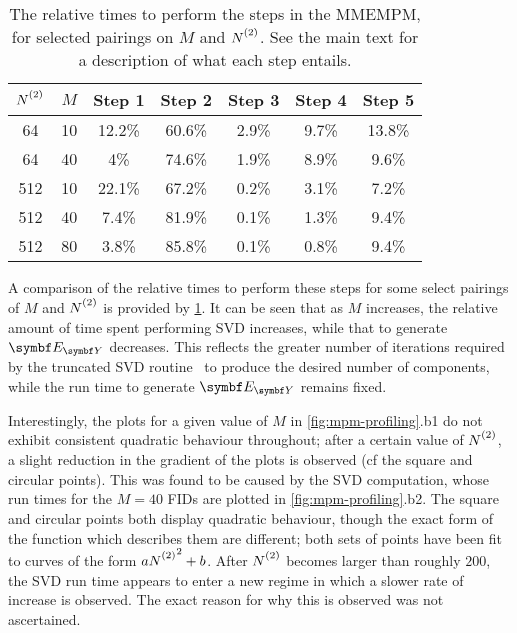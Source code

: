 \begin{table}
    \begin{center}
        \begin{tabular}{ c c c c c c c }
            \toprule
            $\Ntwo$ &
            $M$ &
            Step 1 &
            Step 2 &
            Step 3 &
            Step 4 &
            Step 5 \\
            \midrule
            64 & 10 & 12.2\% & 60.6\% & 2.9\% & 9.7\% & 13.8\% \\
            64 & 40 & 4\% & 74.6\% & 1.9\% & 8.9\% & 9.6\% \\
            512 & 10 & 22.1\% & 67.2\% & 0.2\% & 3.1\% & 7.2\% \\
            512 & 40 & 7.4\% & 81.9\% & 0.1\% & 1.3\% & 9.4\% \\
            512 & 80 & 3.8\% & 85.8\% & 0.1\% & 0.8\% & 9.4\% \\
            \bottomrule
        \end{tabular}
    \end{center}
    \caption[
        The relative times to perform the steps in the \acs{MMEMPM}.
    ]{
        The relative times to perform the steps in the
        \acs{MMEMPM}, for selected pairings on $M$ and $\Ntwo$. See the main
        text for a description of what each step entails.
    }
    \label{tab:mmempm-steps}
\end{table}
A comparison of the relative times to perform these steps for some select
pairings of $M$ and $\Ntwo$ is provided by \cref{tab:mmempm-steps}. It can be
seen that as $M$ increases, the relative amount of time spent performing
\ac{SVD} increases, while that to generate $\EY$ decreases. This
reflects the greater number of iterations required by
the truncated \ac{SVD} routine~\cite{svds} to produce the desired number of
components, while the run time to generate $\EY$ remains fixed.

Interestingly, the plots for a given value of $M$ in
\cref{fig:mpm-profiling}.b1 do not exhibit
consistent quadratic behaviour throughout; after a certain value of $\Ntwo$, a
slight reduction in the gradient of the plots is observed (cf
the square and circular points). This was found to be caused by the \ac{SVD}
computation, whose run times for the $M=40$ \acp{FID} are plotted in
\cref{fig:mpm-profiling}.b2.
The square and circular points both display quadratic behaviour, though the
exact form of the function which
describes them are different; both sets of points have been fit to curves of
the form $a\Ntwo^2 + b$. After $\Ntwo$ becomes larger than
roughly $200$, the \ac{SVD} run time appears to enter a new regime in which
a slower rate of increase is observed. The exact reason for why this is
observed was not ascertained.

